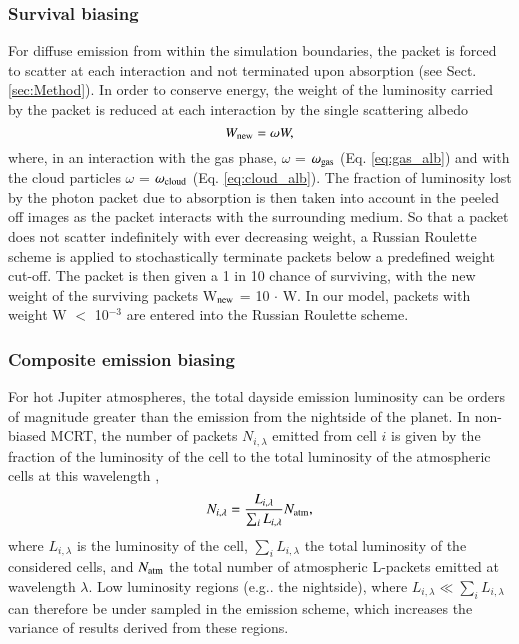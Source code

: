 \documentclass{aa}
\begin{document}
\subsubsection{Survival biasing}
\label{sec:rrw}

For diffuse emission from within the simulation boundaries, the packet is forced to scatter at each interaction and not terminated upon absorption (see Sect. \ref{sec:Method}).
In order to conserve energy, the weight of the luminosity carried by the packet is reduced at each interaction by the single scattering albedo
\begin{equation}
W_{\rm new} = \omega W,
\end{equation}
where, in an interaction with the gas phase, $\omega$ = $\omega_{\rm gas}$ (Eq. \ref{eq:gas_alb}) and with the cloud particles  $\omega$ = $\omega_{\rm cloud}$ (Eq. \ref{eq:cloud_alb}).
The fraction of luminosity lost by the photon packet due to absorption is then taken into account in the peeled off images as the packet interacts with the surrounding medium.
So that a packet does not scatter indefinitely with ever decreasing weight, a Russian Roulette scheme \citep[e.g.][]{Dupree2002} is applied to stochastically terminate packets below a predefined weight cut-off.
The packet is then given a 1 in 10 chance of surviving, with the new weight of the surviving packets W$_{\rm new}$  = 10 $\cdot$ W.
In our model, packets with weight W $<$ 10$^{-3}$ are entered into the Russian Roulette scheme.

\subsubsection{Composite emission biasing}
\label{sec:comp_bias}

For hot Jupiter atmospheres, the total dayside emission luminosity can be orders of magnitude greater than the emission from the nightside of the planet.
In non-biased MCRT, the number of packets $N_{i, \lambda}$ emitted from cell $i$ is given by the fraction of the luminosity of the cell to the total luminosity of the atmospheric cells at this wavelength \citep[e.g.][]{Pinte2006},
\begin{equation}
\label{eq:num_source}
N_{i, \lambda} = \frac{L_{i, \lambda}}{\sum_{i} L_{i, \lambda}} N_{\rm atm},
\end{equation}
where $L_{i, \lambda}$ is the luminosity of the cell, $\sum_{i} L_{i, \lambda}$ the total luminosity of the considered cells, and $N_{\rm atm}$ the total number of atmospheric L-packets emitted at wavelength $\lambda$.
Low luminosity regions (e.g.. the nightside), where $L_{i, \lambda} \ll \sum_{i} L_{i, \lambda}$  can therefore be under sampled in the emission scheme, which increases the variance of results derived from these regions.
\end{document}
